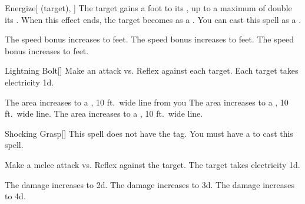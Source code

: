 \lowercase{\hypertarget{spell:Energize}{}}\label{spell:Energize}
\begin{attuneability}[Rank 1]{\hypertarget{spell:Energize}{Energize}}[ (target), ]
The target gains a  foot  to its , up to a maximum of double its .
When this effect ends, the target becomes  as a .
You can cast this spell as a .

\rankline
{} The speed bonus increases to  feet.
 The speed bonus increases to  feet.
 The speed bonus increases to  feet.
\end{attuneability}
\vspace{0.25em}



\lowercase{\hypertarget{spell:Lightning Bolt}{}}\label{spell:Lightning Bolt}
\begin{freeability}[Rank 1]{\hypertarget{spell:Lightning Bolt}{Lightning Bolt}}[]
Make an attack vs. Reflex against each target.
\hit Each target takes electricity  \minus1d.

\rankline
{} The area increases to a \arealarge, 10 ft.\ wide line from you
 The area increases to a \areahuge, 10 ft.\ wide line.
 The area increases to a \areaext, 10 ft.\ wide line.
\end{freeability}
\vspace{0.25em}



\lowercase{\hypertarget{spell:Shocking Grasp}{}}\label{spell:Shocking Grasp}
\begin{freeability}[Rank 1]{\hypertarget{spell:Shocking Grasp}{Shocking Grasp}}[]
This spell does not have the  tag.
You must have a  to cast this spell.

Make a melee attack vs. Reflex against the target.
\hit The target takes electricity  \plus1d.

\rankline
{} The damage increases to  \plus2d.
 The damage increases to  \plus3d.
 The damage increases to  \plus4d.
\end{freeability}
\vspace{0.25em}



